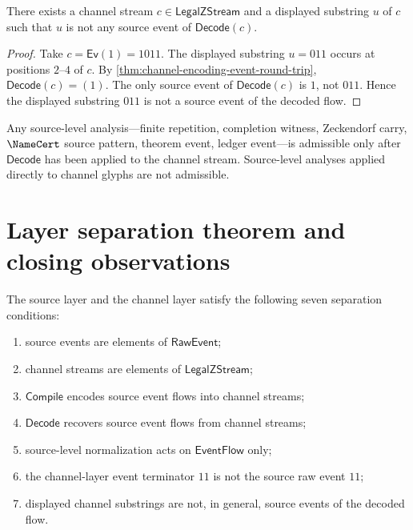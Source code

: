 \begin{proposition}
\label{prop:source-channel-substring-not-source-event}
There exists a channel stream $c \in \mathsf{LegalZStream}$ and a displayed substring $u$ of $c$ such that $u$ is not any source event of $\mathsf{Decode}(c)$.
\end{proposition}

\begin{proof}
Take $c = \mathsf{Ev}(1) = 1011$. The displayed substring $u = 011$ occurs at positions $2$--$4$ of $c$. By \autoref{thm:channel-encoding-event-round-trip}, $\mathsf{Decode}(c) = (1)$. The only source event of $\mathsf{Decode}(c)$ is $1$, not $011$. Hence the displayed substring $011$ is not a source event of the decoded flow.
\end{proof}

\begin{corollary}
\label{cor:source-channel-analysis-after-decoding}
Any source-level analysis---finite repetition, completion witness, Zeckendorf carry, $\NameCert$ source pattern, theorem event, ledger event---is admissible only after $\mathsf{Decode}$ has been applied to the channel stream. Source-level analyses applied directly to channel glyphs are not admissible.
\end{corollary}

\section{Layer separation theorem and closing observations}
\label{sec:source-channel-layer-separation-theorem}

\begin{theorem}
\label{thm:source-channel-layer-separation}
The source layer and the channel layer satisfy the following seven separation conditions:
\begin{enumerate}
  \item source events are elements of $\mathsf{RawEvent}$;
  \item channel streams are elements of $\mathsf{LegalZStream}$;
  \item $\mathsf{Compile}$ encodes source event flows into channel streams;
  \item $\mathsf{Decode}$ recovers source event flows from channel streams;
  \item source-level normalization acts on $\mathsf{EventFlow}$ only;
  \item the channel-layer event terminator $11$ is not the source raw event $11$;
  \item displayed channel substrings are not, in general, source events of the decoded flow.
\end{enumerate}
\end{theorem}


